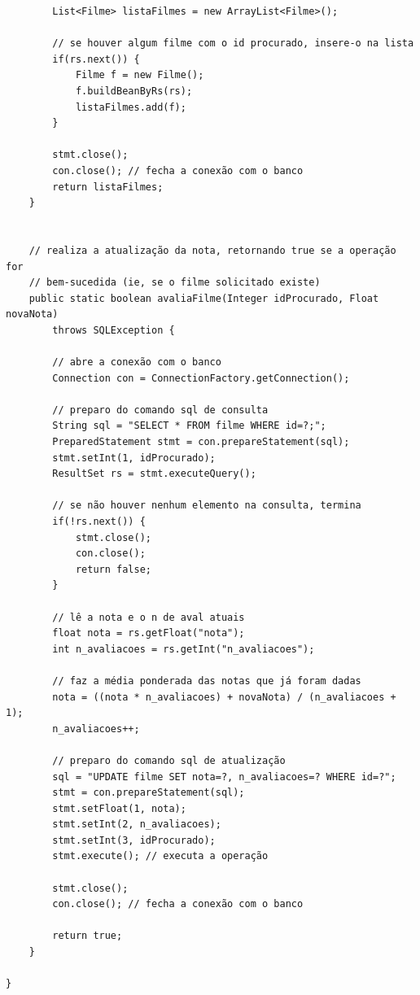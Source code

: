 \documentclass[11pt,twoside]{article}
\begin{document}
\begin{verbatim}
		List<Filme> listaFilmes = new ArrayList<Filme>();

		// se houver algum filme com o id procurado, insere-o na lista
		if(rs.next()) {
			Filme f = new Filme();
			f.buildBeanByRs(rs);
			listaFilmes.add(f);
		}

		stmt.close();
		con.close(); // fecha a conexão com o banco
		return listaFilmes;
	}


	// realiza a atualização da nota, retornando true se a operação for
	// bem-sucedida (ie, se o filme solicitado existe)
	public static boolean avaliaFilme(Integer idProcurado, Float novaNota)
		throws SQLException {

		// abre a conexão com o banco
		Connection con = ConnectionFactory.getConnection();
		
		// preparo do comando sql de consulta
		String sql = "SELECT * FROM filme WHERE id=?;";
		PreparedStatement stmt = con.prepareStatement(sql);
		stmt.setInt(1, idProcurado);
		ResultSet rs = stmt.executeQuery();
		
		// se não houver nenhum elemento na consulta, termina
		if(!rs.next()) {
			stmt.close();
			con.close();
			return false;
		}

		// lê a nota e o n de aval atuais
		float nota = rs.getFloat("nota");
		int n_avaliacoes = rs.getInt("n_avaliacoes");
		
		// faz a média ponderada das notas que já foram dadas
		nota = ((nota * n_avaliacoes) + novaNota) / (n_avaliacoes + 1);
		n_avaliacoes++;
		
		// preparo do comando sql de atualização
		sql = "UPDATE filme SET nota=?, n_avaliacoes=? WHERE id=?";
		stmt = con.prepareStatement(sql);
		stmt.setFloat(1, nota);
		stmt.setInt(2, n_avaliacoes);
		stmt.setInt(3, idProcurado);
		stmt.execute(); // executa a operação
		
		stmt.close();
		con.close(); // fecha a conexão com o banco

		return true;
	}

}
\end{verbatim}


\end{document}
